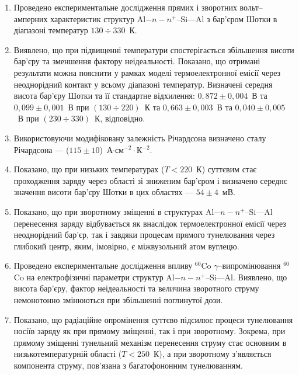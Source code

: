   \begin{enumerate}
     \item Проведено експериментальне дослідження прямих і зворотних вольт--амперних характеристик структур Al$-n-n^+$--Si---Al з бар'єром Шотки в діапазоні температур $130\div330$~К.

     \item Виявлено, що при підвищенні температури спостерігається збільшення висоти бар'єру та зменшення фактору неідеальності.
       Показано, що отримані результати можна пояснити у рамках моделі термоелектронної емісії через неоднорідний контакт у всьому діапазоні температур.
       Визначені середня висота бар'єру Шотки та її стандартне відхилення:
       $0,872\pm0,004$~В та $0,099\pm0,001$~В при $(130\div220)$~К та
       $0,663\pm0,003$~В та $0,040\pm0,005$~В при $(230\div330)$~К, відповідно.

     \item Використовуючи модифіковану залежність Річардсона визначено сталу Річардсона --- ($115\pm10$)~А$\cdot$см$^{-2}\cdot$К$^{-2}$.

     \item Показано, що при низьких температурах ($T<220$~К) суттєвим стає проходження заряду через області зі зниженим бар'єром і
           визначено середнє значення висоти бар'єру Шотки в цих областях --- $54\pm4$~мВ.

    \item Показано, що при зворотному зміщенні в структурах Al$-n-n^+$--Si---Al перенесення заряду відбувається як внаслідок
          термоелектронної емісії через неоднорідний бар'єр, так і завдяки процесам прямого тунелювання через глибокий центр,
          яким, імовірно, є міжвузольний атом вуглецю.

\item Проведено експериментальне дослідження впливу $^{60}$Co $\gamma$--ви\-про\-мі\-ню\-ван\-ня $^{60}$Co на електрофізичні параметри
     структур Al$-n-n^+$--Si---Al.
Виявлено, що висота бар'єру, фактор неідеальності та величина зворотного струму немонотонно змінюються при збільшенні поглинутої дози.

\item Показано, що радіаційне опромінення суттєво підсилює процеси тунелювання носіїв заряду як при прямому зміщенні, так і при зворотному.
     Зокрема, при прямому зміщенні тунельний механізм перенесення струму стає основним в низькотемпературній області ($T<250$~К),
а при зворотному з'являється компонента струму, пов'язана з багатофононним тунелюванням.


\end{enumerate}
